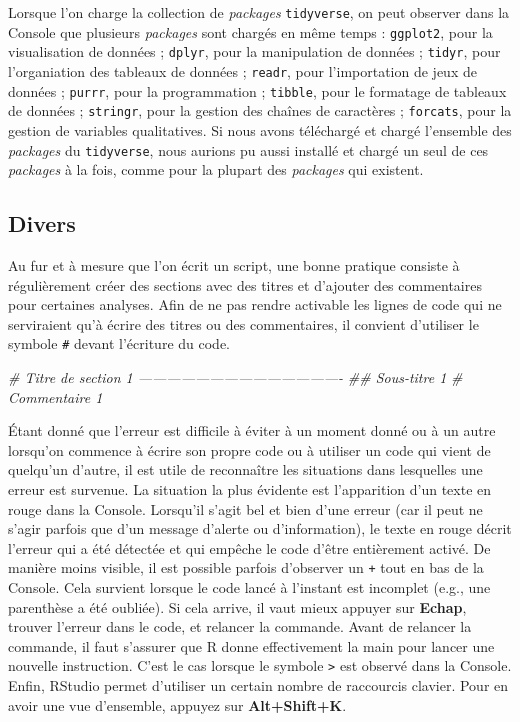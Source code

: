 \documentclass[
  french,
]{book}
\newenvironment{Shaded}{\begin{snugshade}}{\end{snugshade}}
\newcommand{\CommentTok}[1]{\textcolor[rgb]{0.56,0.35,0.01}{\textit{#1}}}
\begin{document}
Lorsque l'on charge la collection de \emph{packages} \texttt{tidyverse}, on peut observer dans la Console que plusieurs \emph{packages} sont chargés en même temps : \texttt{ggplot2}, pour la visualisation de données ; \texttt{dplyr}, pour la manipulation de données ; \texttt{tidyr}, pour l'organiation des tableaux de données ; \texttt{readr}, pour l'importation de jeux de données ; \texttt{purrr}, pour la programmation ; \texttt{tibble}, pour le formatage de tableaux de données ; \texttt{stringr}, pour la gestion des chaînes de caractères ; \texttt{forcats}, pour la gestion de variables qualitatives. Si nous avons téléchargé et chargé l'ensemble des \emph{packages} du \texttt{tidyverse}, nous aurions pu aussi installé et chargé un seul de ces \emph{packages} à la fois, comme pour la plupart des \emph{packages} qui existent.

\hypertarget{divers}{%
\subsection{Divers}\label{divers}}

Au fur et à mesure que l'on écrit un script, une bonne pratique consiste à régulièrement créer des sections avec des titres et d'ajouter des commentaires pour certaines analyses. Afin de ne pas rendre activable les lignes de code qui ne serviraient qu'à écrire des titres ou des commentaires, il convient d'utiliser le symbole \texttt{\#} devant l'écriture du code.

\begin{Shaded}
\begin{Highlighting}[]
\CommentTok{# Titre de section 1 -------------------------------------------}
\CommentTok{## Sous-titre 1}
  \CommentTok{# Commentaire 1}
\end{Highlighting}
\end{Shaded}

Étant donné que l'erreur est difficile à éviter à un moment donné ou à un autre lorsqu'on commence à écrire son propre code ou à utiliser un code qui vient de quelqu'un d'autre, il est utile de reconnaître les situations dans lesquelles une erreur est survenue. La situation la plus évidente est l'apparition d'un texte en rouge dans la Console. Lorsqu'il s'agit bel et bien d'une erreur (car il peut ne s'agir parfois que d'un message d'alerte ou d'information), le texte en rouge décrit l'erreur qui a été détectée et qui empêche le code d'être entièrement activé. De manière moins visible, il est possible parfois d'observer un \texttt{+} tout en bas de la Console. Cela survient lorsque le code lancé à l'instant est incomplet (e.g., une parenthèse a été oubliée). Si cela arrive, il vaut mieux appuyer sur \textbf{Echap}, trouver l'erreur dans le code, et relancer la commande. Avant de relancer la commande, il faut s'assurer que R donne effectivement la main pour lancer une nouvelle instruction. C'est le cas lorsque le symbole \texttt{\textgreater{}} est observé dans la Console. Enfin, RStudio permet d'utiliser un certain nombre de raccourcis clavier. Pour en avoir une vue d'ensemble, appuyez sur \textbf{Alt+Shift+K}.
\end{document}
